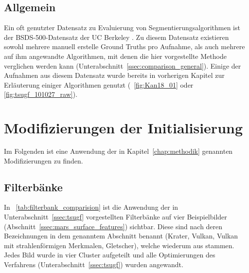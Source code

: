 \subsection{Allgemein}
\label{ssec:bsds500}
Ein oft genutzter Datensatz zu Evaluierung von Segmentierungsalgorithmen ist der BSDS-500-Datensatz der UC Berkeley \cite{bsd500}. Zu diesem Datensatz existieren sowohl mehrere manuell erstelle Ground Truths pro Aufnahme, als auch mehrere auf ihm angewandte Algorithmen, mit denen die hier vorgestellte Methode verglichen werden kann (\vgl Unterabschnitt~\ref{ssec:comparison_general}).
Einige der Aufnahmen aus diesem Datensatz wurde bereits in vorherigen Kapitel zur Erläuterung einiger Algorithmen genutzt (\vgl \bspw \figurename~\ref{fig:Kan18_01} oder \ref{fig:tsugf_101027_raw}).

\section{Modifizierungen der Initialisierung}
\label{sec:modifications}

Im Folgenden ist eine Anwendung der in Kapitel~\ref{chap:methodik} genannten Modifizierungen zu finden.

\subsection{Filterbänke}
\label{ssec:exp_filterbanks}

In \tablename~\ref{tab:filterbank_comparision} ist die Anwendung der in Unterabschnitt~\ref{ssec:tsugf} vorgestellten Filterbänke auf vier Beispielbilder (\vgl Abschnitt~\ref{ssec:mars_surface_features}) sichtbar. Diese sind nach deren Bezeichnungen in dem genanntem Abschnitt benannt (Krater, Vulkan, Vulkan mit strahlenförmigen Merkmalen, Gletscher), welche wiederum aus \cite[Kap.~7]{greeley_13} stammen. Jedes Bild wurde in vier Cluster aufgeteilt und alle Optimierungen des Verfahrens (\vgl Unterabschnitt~\ref{ssec:tsugf}) wurden angewandt.

